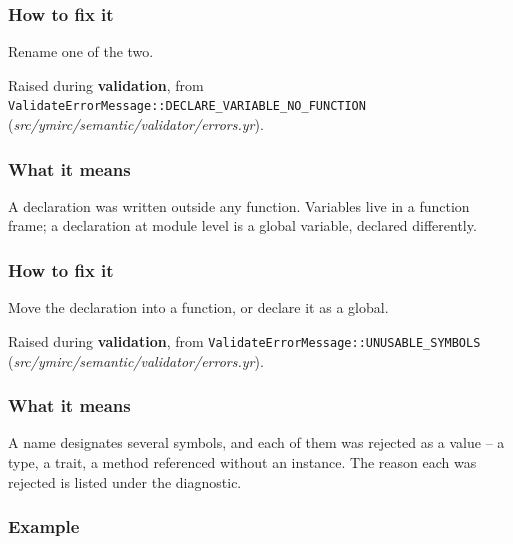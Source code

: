 \subsubsection*{How to fix it}

Rename one of the two.

\label{sec:codes:e4281}

Raised during \textbf{validation}, from \texttt{ValidateErrorMessage::\allowbreak{}DECLARE\_\allowbreak{}VARIABLE\_\allowbreak{}NO\_\allowbreak{}FUNCTION} (\textit{src/\allowbreak{}ymirc/\allowbreak{}semantic/\allowbreak{}validator/\allowbreak{}errors.yr}).

\subsubsection*{What it means}

A  declaration was written outside any function. Variables live in a function frame; a declaration at module level is a global variable, declared differently.

\subsubsection*{How to fix it}

Move the declaration into a function, or declare it as a global.

\label{sec:codes:e4290}

Raised during \textbf{validation}, from \texttt{ValidateErrorMessage::\allowbreak{}UNUSABLE\_\allowbreak{}SYMBOLS} (\textit{src/\allowbreak{}ymirc/\allowbreak{}semantic/\allowbreak{}validator/\allowbreak{}errors.yr}).

\subsubsection*{What it means}

A name designates several symbols, and each of them was rejected as a value -- a type, a trait, a method referenced without an instance. The reason each was rejected is listed under the diagnostic.

\subsubsection*{Example}


